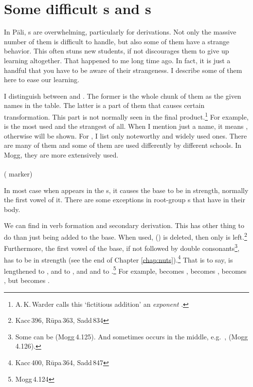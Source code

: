 \section*{Some difficult s and s}\label{sec:anubandha}

In P\=ali, s are overwhelming, particularly for derivations. Not only the massive number of them is difficult to handle, but also some of them have a strange behavior. This often stuns new students, if not discourages them to give up learning altogether. That happened to me long time ago. In fact, it is just a handful that you have to be aware of their strangeness. I describe some of them here to ease our learning.

I distinguish between  and . The former is the whole chunk of them as the given names in the table. The latter is a part of them that causes certain transformation. This part is not normally seen in the final product.\footnote{A.\,K.\,Warder calls this `fictitious addition' an \emph{exponent} \citep[p.~251]{warder:intro}.} For example,  is the most used and the strangest of all. When I mention just a name, it means , otherwise  will be shown. For , I list only noteworthy and widely used ones. There are many of them and some of them are used differently by different schools. In Mogg, they are more extensively used.

\paragraph*{}\label{par:dnapacc} ( marker)

In most case when  appears in the s, it causes the base to be in  strength, normally the first vowel of it. There are some exceptions in root-group s that have  in their body.

We can find  in verb formation and secondary derivation. This  has other thing to do than just being added to the base. When used,  () is deleted, then only  is left.\footnote{Kacc\,396, R\=upa\,363, Sadd\,834} Furthermore, the first vowel of the base, if not followed by double consonants\footnote{Some can be (Mogg\,4.125). And  sometimes occurs in the middle, e.g.\ ,  (Mogg\,4.126).}, has to be in  strength (see the end of Chapter \ref{chap:nuts}).\footnote{Kacc\,400, R\=upa\,364, Sadd\,847} That is to say,  is lengthened to ,  and  to , and  and  to .\footnote{Mogg\,4.124} For example,  becomes ,  becomes ,  becomes , but  becomes .

